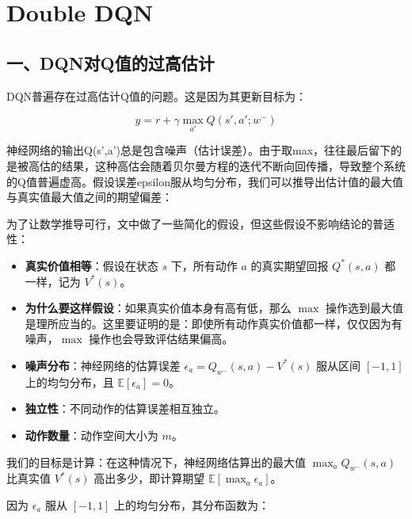 \setcounter{section}{5}

\hypertarget{double-dqn}{%
\section{Double DQN}\label{double-dqn}}

\hypertarget{ux4e00dqnux5bf9qux503cux7684ux8fc7ux9ad8ux4f30ux8ba1}{%
\subsection{一、DQN对Q值的过高估计}\label{ux4e00dqnux5bf9qux503cux7684ux8fc7ux9ad8ux4f30ux8ba1}}

DQN普遍存在过高估计Q值的问题。这是因为其更新目标为：

\[
y=r+\gamma\max_{a'}Q(s',a';w^{-})
\]

神经网络的输出Q(s',a')总是包含噪声（估计误差）。由于取max，往往最后留下的是被高估的结果，这种高估会随着贝尔曼方程的迭代不断向回传播，导致整个系统的Q值普遍虚高。假设误差epsilon服从均匀分布，我们可以推导出估计值的最大值与真实值最大值之间的期望偏差：

为了让数学推导可行，文中做了一些简化的假设，但这些假设不影响结论的普适性：

\begin{itemize}
\tightlist
\item
  \textbf{真实价值相等}：假设在状态 \(s\) 下，所有动作 \(a\) 的真实期望回报 \(Q^{*}(s,a)\) 都一样，记为 \(V^{*}(s)\)。
\item
  \textbf{为什么要这样假设}：如果真实价值本身有高有低，那么 \(\max\) 操作选到最大值是理所应当的。这里要证明的是：即使所有动作真实价值都一样，仅仅因为有噪声，\(\max\) 操作也会导致评估结果偏高。
\item
  \textbf{噪声分布}：神经网络的估算误差 \(\epsilon_a=Q_{w^{-}}(s,a)-V^{*}(s)\) 服从区间 \([-1,1]\) 上的均匀分布，且 \(\mathbb{E}[\epsilon_a]=0\)。
\item
  \textbf{独立性}：不同动作的估算误差相互独立。
\item
  \textbf{动作数量}：动作空间大小为 \(m\)。
\end{itemize}

我们的目标是计算：在这种情况下，神经网络估算出的最大值 \(\max_a Q_{w^{-}}(s,a)\) 比真实值 \(V^{*}(s)\) 高出多少，即计算期望 \(\mathbb{E}[\max_a\epsilon_a]\)。

因为 \(\epsilon_a\) 服从 \([-1,1]\) 上的均匀分布，其分布函数为：

